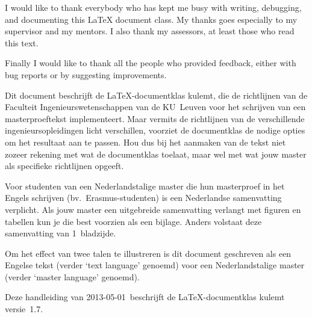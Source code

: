 \documentclass[master=elt,masteroption=im,english,oneside]{kulemt}
\newcommand*\classversion{1.7}
\newcommand*\manualdate{2013-05-01}
\newcommand*\cls[1]{\textsf{#1}}
\newcommand\English[1]{`\foreignlanguage{english}{#1}'}
\begin{document}
\begin{preface}
  I would like to thank everybody who has kept me busy with writing,
  debugging, and documenting this LaTeX document class. My thanks goes
  especially to my supervisor and my mentors. I also thank my assessors,
  at least those who read this text.

  Finally I would like to thank all the people who provided feedback,
  either with bug reports or by suggesting improvements.
\end{preface}

\tableofcontents*

\begin{abstract}
  This document describes the use of the LaTeX document class \cls{kulemt},
  which implements the KU~Leuven Faculty of Engineering guidelines for
  writing a master thesis. Since there are slight differences between the
  actual guidelines of the different engineering masters, this class
  implements not only the common part, but it also provides the necessary
  options to adapt it to the specific requirements. So please check the
  guidelines of your master before using or tweaking typesetting options.

  To illustrate the difference between the main text language and the
  master language, this document is written in English (as the main text
  language) for a Dutch master.

  This manual (dated \manualdate) describes the \cls{kulemt} class
  version~\classversion.
\end{abstract}

\begin{abstract*}
  Dit document beschrijft de LaTeX-documentklas \cls{kulemt}, die de
  richtlijnen van de Faculteit Ingenieurswetenschappen van de KU~Leuven
  voor het schrijven van een masterproeftekst implementeert. Maar vermits
  de richtlijnen van de verschillende ingenieursopleidingen licht
  verschillen, voorziet de documentklas de nodige opties om het resultaat
  aan te passen. Hou dus bij het aanmaken van de tekst niet zozeer rekening
  met wat de documentklas toelaat, maar wel met wat jouw master als
  specifieke richtlijnen opgeeft.

  Voor studenten van een Nederlandstalige master die hun masterproef in het
  Engels schrijven (bv.\ Erasmus-studenten) is een Nederlandse samenvatting
  verplicht. Als jouw master een uitgebreide samenvatting verlangt met
  figuren en tabellen kun je die best voorzien als een bijlage. Anders
  volstaat deze samenvatting van 1~bladzijde.

  Om het effect van twee talen te illustreren is dit document geschreven
  als een Engelse tekst (verder \English{text language} genoemd) voor een
  Nederlandstalige master (verder \English{master language} genoemd).

  Deze handleiding van \manualdate\ beschrijft de LaTeX-documentklas
  \cls{kulemt} versie~\classversion.
\end{abstract*}

\listoffiguresandtables

\mainmatter



%

\appendix
\appendixpage*




\backmatter





\end{document}
